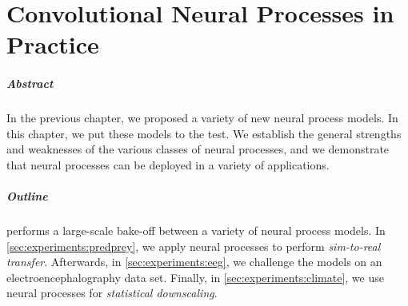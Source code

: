 \documentclass[12pt, twoside]{report}
\begin{document}
\newcommand{\shortminus}{\scalebox{0.7}[1]{$-$}}

\chapter
    [Convolutional Neural Processes in Practice]
    {Convolutional Neural Processes \tnl in Practice}
\label{chap:experiments}

\paragraph{Abstract}
In the previous chapter, we proposed a variety of new neural process models.
In this chapter, we put these models to the test.
We establish the general strengths and weaknesses of the various classes of neural processes,
and we demonstrate that neural processes can be deployed in a variety of applications.

\paragraph{Outline}
 performs a large-scale bake-off between a variety of neural process models.
In \cref{sec:experiments:predprey}, we apply neural processes to perform \emph{sim-to-real transfer}.
Afterwards, in \cref{sec:experiments:eeg}, we challenge the models on an electroencephalography data set.
Finally, in \cref{sec:experiments:climate}, we use neural processes for \emph{statistical downscaling}.
\end{document}
